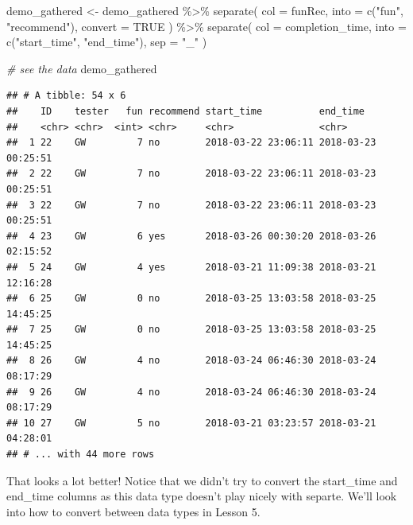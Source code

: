 \documentclass[
]{book}
\newenvironment{Shaded}{\begin{snugshade}}{\end{snugshade}}
\newcommand{\AttributeTok}[1]{\textcolor[rgb]{0.77,0.63,0.00}{#1}}
\newcommand{\CommentTok}[1]{\textcolor[rgb]{0.56,0.35,0.01}{\textit{#1}}}
\newcommand{\ConstantTok}[1]{\textcolor[rgb]{0.00,0.00,0.00}{#1}}
\newcommand{\FunctionTok}[1]{\textcolor[rgb]{0.00,0.00,0.00}{#1}}
\newcommand{\NormalTok}[1]{#1}
\newcommand{\OtherTok}[1]{\textcolor[rgb]{0.56,0.35,0.01}{#1}}
\newcommand{\SpecialCharTok}[1]{\textcolor[rgb]{0.00,0.00,0.00}{#1}}
\newcommand{\StringTok}[1]{\textcolor[rgb]{0.31,0.60,0.02}{#1}}
\begin{document}
\begin{Shaded}
\begin{Highlighting}[]
\NormalTok{demo\_gathered }\OtherTok{\textless{}{-}}\NormalTok{ demo\_gathered }\SpecialCharTok{\%\textgreater{}\%}
  \FunctionTok{separate}\NormalTok{(}
    \AttributeTok{col =}\NormalTok{ funRec,}
    \AttributeTok{into =} \FunctionTok{c}\NormalTok{(}\StringTok{"fun"}\NormalTok{, }\StringTok{"recommend"}\NormalTok{),}
    \AttributeTok{convert =} \ConstantTok{TRUE}
\NormalTok{    ) }\SpecialCharTok{\%\textgreater{}\%}
  \FunctionTok{separate}\NormalTok{(}
    \AttributeTok{col =}\NormalTok{ completion\_time,}
    \AttributeTok{into =} \FunctionTok{c}\NormalTok{(}\StringTok{"start\_time"}\NormalTok{, }\StringTok{"end\_time"}\NormalTok{),}
    \AttributeTok{sep =} \StringTok{"\_"}
\NormalTok{    )}
\end{Highlighting}
\end{Shaded}

\begin{Shaded}
\begin{Highlighting}[]
\CommentTok{\# see the data}
\NormalTok{demo\_gathered}
\end{Highlighting}
\end{Shaded}

\begin{verbatim}
## # A tibble: 54 x 6
##    ID    tester   fun recommend start_time          end_time           
##    <chr> <chr>  <int> <chr>     <chr>               <chr>              
##  1 22    GW         7 no        2018-03-22 23:06:11 2018-03-23 00:25:51
##  2 22    GW         7 no        2018-03-22 23:06:11 2018-03-23 00:25:51
##  3 22    GW         7 no        2018-03-22 23:06:11 2018-03-23 00:25:51
##  4 23    GW         6 yes       2018-03-26 00:30:20 2018-03-26 02:15:52
##  5 24    GW         4 yes       2018-03-21 11:09:38 2018-03-21 12:16:28
##  6 25    GW         0 no        2018-03-25 13:03:58 2018-03-25 14:45:25
##  7 25    GW         0 no        2018-03-25 13:03:58 2018-03-25 14:45:25
##  8 26    GW         4 no        2018-03-24 06:46:30 2018-03-24 08:17:29
##  9 26    GW         4 no        2018-03-24 06:46:30 2018-03-24 08:17:29
## 10 27    GW         5 no        2018-03-21 03:23:57 2018-03-21 04:28:01
## # ... with 44 more rows
\end{verbatim}

That looks a lot better! Notice that we didn't try to convert the start\_time and end\_time columns as this data type doesn't play nicely with separte. We'll look into how to convert between data types in Lesson 5.
\end{document}
